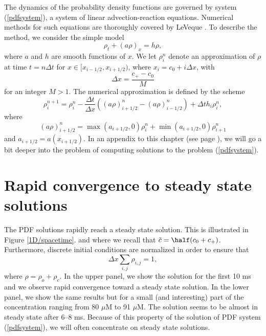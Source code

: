 The dynamics of the probability density functions are governed by system (\ref{pdfsystem}), a system of linear advection-reaction equations. Numerical methods for such equations are thoroughly covered by LeVeque \cite{LeVeque2002}.  
To describe the method, we consider the simple model
\begin{equation}
\rho_{t}+(a\rho)_{x}=h\rho  \label{advectionreaction},
\end{equation}
where $a$ and $h$ are smooth functions of $x$. We let $\rho_{i}^{n}$
denote an approximation of $\rho$ at time $t=n\Delta t$ for $x\in\lbrack
x_{i-1/2},x_{i+1/2})$, where $x_i=c_0+i \Delta x$, with
\[
\Delta x=\frac{c_+-c_0}{M}
\] 
for an integer $M>1$. The
numerical approximation is defined by the scheme
\begin{equation}
\rho_{i}^{n+1}=\rho_{i}^{n}-\frac{\Delta t}{\Delta x}\left(  \left(
a\rho\right)  _{i+1/2}^{n}-\left(  a\rho\right)  _{i-1/2}^{n}\right)  +\Delta
th_{i}\rho_{i}^{n}, \label{eq:scheme}
\end{equation}
where
\begin{equation}
\left(  a\rho\right)  _{i+1/2}^{n}=\max(a_{i+1/2},0)\rho_{i}^{n}
+\min(a_{i+1/2},0)\rho_{i+1}^{n} \label{eq:flux}
\end{equation}
and $a_{i+1/2}=a(x_{i+1/2})$.
In an appendix to this chapter (see page \pageref{appendix_hyp}), we will go a bit deeper into the problem of computing solutions to the problem (\ref{pdfsystem}).





\section{Rapid convergence to steady state solutions}
\label{sec:rapid} 

The PDF solutions rapidly reach a steady state solution. This is illustrated in Figure \ref{1D/spacetime}.  
 and where
we recall that $\tilde{c}=\half (c_0+c_+)$.
 Furthermore, discrete initial conditions are normalized in order to ensure that
\begin{equation}
\Delta x \sum_{i,j}  \rho_{i,j}=1,  \label{discrete_sumone_1}
\end{equation}
where $\rho=\rho_{o}+\rho_{c}$.  In the upper panel, we show the solution for the first 10 ms and we observe rapid convergence toward a steady state solution. In the lower panel, we show the same results but for a small (and interesting) part of the concentration ranging from 80 $\mu$M to 91 $\mu$M. The solution seems to be almost in steady state after 6--8 ms. Because of this property of the solution of PDF system (\ref{pdfsystem}), we will often concentrate on steady state solutions. 

